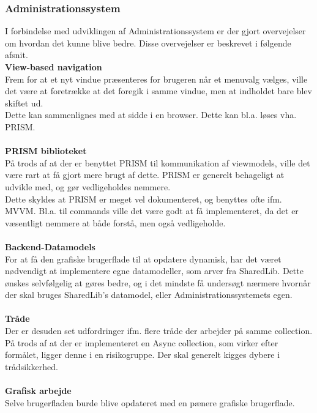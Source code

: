 \subsubsection{Administrationssystem}

I forbindelse med udviklingen af Administrationssystem er der gjort overvejelser om hvordan det kunne blive bedre. Disse overvejelser er beskrevet i følgende afsnit.\\
 
 
\textbf{View-based navigation}\\
Frem for at et nyt vindue præsenteres for brugeren når et menuvalg vælges, ville det være at foretrække at det foregik i samme vindue, men at indholdet bare blev skiftet ud.\\
Dette kan sammenlignes med at sidde i en browser. Dette kan bl.a. løses vha. PRISM.\\\\

 
\textbf{PRISM biblioteket}\\
På trods af at der er benyttet PRISM til kommunikation af viewmodels, ville det være rart at få gjort mere brugt af dette. PRISM er generelt behageligt at udvikle med, og gør vedligeholdes nemmere.\\
Dette skyldes at PRISM er meget vel dokumenteret, og benyttes ofte ifm. MVVM. Bl.a. til commands ville det være godt at få implementeret, da det er væsentligt nemmere at både forstå, men også vedligeholde.\\\\
 
 
\textbf{Backend-Datamodels}\\
For at få den grafiske brugerflade til at opdatere dynamisk, har det været nødvendigt at implementere egne datamodeller, som arver fra SharedLib. Dette ønskes selvfølgelig at gøres bedre, og i det mindste få undersøgt nærmere hvornår der skal bruges SharedLib's datamodel, eller Administrationssystemets egen.\\\\
 
\textbf{Tråde}\\
Der er desuden set udfordringer ifm. flere tråde der arbejder på samme collection. På trods af at der er implementeret en Async collection, som virker efter formålet, ligger denne i en risikogruppe. Der skal generelt kigges dybere i trådsikkerhed.\\\\
 
 
\textbf{Grafisk arbejde}\\
Selve brugerfladen burde blive opdateret med en pænere grafiske brugerflade.